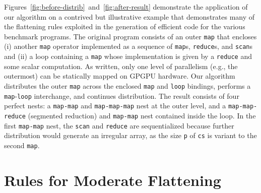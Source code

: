 Figures~\ref{fig:before-distrib}~and~\ref{fig:after-result}
demonstrate the application of our algorithm on a contrived but
illustrative example that demonstrates many of the flattening rules
exploited in the generation of efficient code for the various
benchmark programs.  The original program consists of an outer
\lstinline{map} that encloses (i) another \lstinline{map} operator
implemented as a sequence of \lstinline{map}s, \lstinline{reduce}s,
and \lstinline{scan}s and (ii) a loop containing a \lstinline{map}
whose implementation is given by a \lstinline{reduce} and some scalar
computation.  As written, only one level of parallelism (e.g., the
outermost) can be statically mapped on GPGPU hardware. Our algorithm
distributes the outer \lstinline{map} across the enclosed
\lstinline{map} and \lstinline{loop} bindings, performs a
\lstinline{map}-\lstinline{loop} interchange, and continues
distribution.  The result consists of four perfect nests: a
\lstinline{map-map} and \lstinline{map-map-map} nest at the outer
level, and a \lstinline{map-map-reduce} (segmented reduction) and
\lstinline{map-map} nest contained inside the loop.  In the first
\lstinline{map-map} nest, the \lstinline{scan} and \lstinline{reduce}
are sequentialized because further distribution would generate an
irregular array, as the size \lstinline{p} of \lstinline{cs} is
variant to the second \lstinline{map}.

\section{Rules for Moderate Flattening}
\label{sec:moderate-flattening-rules}

